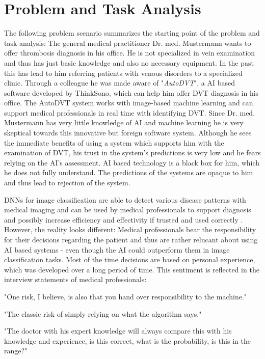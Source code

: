 \documentclass[11pt,a4paper,english]{scrreprt}
\begin{document}
\section{Problem and Task Analysis}
The following problem scenario summarizes the starting point of the problem and task analysis: The general medical practitioner Dr. med. Mustermann wants to offer thrombosis diagnosis in his office. He is not specialized in vein examination and thus has just basic knowledge and also no necessary equipment. In the past this has lead to him referring patients with venous disorders to a specialized clinic. Through a colleague he was made aware of "\textit{AutoDVT}", a AI based software developed by ThinkSono, which can help him offer DVT diagnosis in his office. The AutoDVT system works with image-based machine learning and can support medical professionals in real time with identifying DVT. Since Dr. med. Mustermann has very little knowledge of AI and machine learning he is very skeptical towards this innovative but foreign software system. Although he sees the immediate benefits of using a system which supports him with the examination of DVT, his trust in the system’s predictions is very low and he fears relying on the AI’s assessment. AI based technology is a black box for him, which he does not fully understand. The predictions of the systems are opaque to him and thus lead to rejection of the system.

DNNs for image classification are able to detect various disease patterns with medical imaging and can be used by medical professionals to support diagnosis and possibly increase efficiency and effectivity if trusted and used correctly \parencite{adadi_blackbox_2018,knapic_explainable_2021}. However, the reality looks different: Medical professionals bear the responsibility for their decisions regarding the patient and thus are rather relucant about using AI based systems - even though the AI could outperform them in image classification tasks. Most of the time decisions are based on personal experience, which was developed over a long period of time. This sentiment is reflected in the interview statements of medical professionals:
\begin{displayquote}
    "One risk, I believe, is also that you hand over responsibility to the machine."
\end{displayquote}
\begin{displayquote}
    "The classic risk of simply relying on what the algorithm says."
\end{displayquote}
\begin{displayquote}
    "The doctor with his expert knowledge will always compare this with his knowledge and experience, is this correct, what is the probability, is this in the range?"
\end{displayquote}
\end{document}
